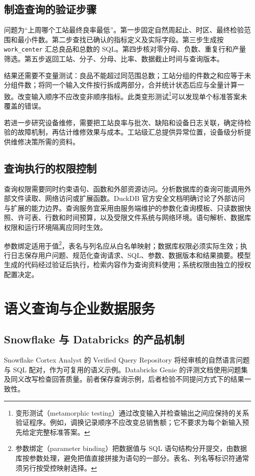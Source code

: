 \subsection{制造查询的验证步骤}
问题为“上周哪个工站最终良率最低”。第一步固定自然周起止、时区、最终检验范围和最小件数。第二步查找已确认的指标定义及实际字段。第三步生成按 \texttt{work\_center} 汇总良品和总数的 SQL。第四步核对零分母、负数、重复行和产量筛选。第五步返回工站、分子、分母、比率、数据截止时间与查询版本。

结果还需要不变量测试：良品不能超过同范围总数；工站分组的件数之和应等于未分组件数；将同一个输入文件按行拆成两部分，合并统计状态后应与全量计算一致。改变输入顺序不应改变非顺序指标。此类变形测试\footnote{变形测试（metamorphic testing）通过改变输入并检查输出之间应保持的关系验证程序。例如，调换记录顺序不应改变总销售额；它不要求为每个新输入预先给定完整标准答案。}可以发现单个标准答案未覆盖的错误。

若进一步研究设备维修，需要把工站良率与批次、缺陷和设备日志关联，确定待检验的故障机制，再估计维修效果与成本。工站级汇总提供异常位置，设备级分析提供维修决策所需的资料。

\subsection{查询执行的权限控制}
查询权限需要同时约束语句、函数和外部资源访问。分析数据库的查询可能调用外部文件读取、网络访问或扩展函数。DuckDB 官方安全文档明确讨论了外部访问与扩展的能力边界\cite{duckdb03}。查询服务宜采用由服务端维护的参数化查询模板、只读数据快照、许可表、行数和时间预算，以及受限文件系统与网络环境。语句解析、数据库权限和运行环境隔离应同时生效。

参数绑定适用于值\footnote{参数绑定（parameter binding）把数据值与 SQL 语句结构分开提交，由数据库按参数处理，避免把值直接拼接为语句的一部分。表名、列名等标识符通常须另行按受控映射选择。}，表名与列名应从白名单映射；数据库权限必须实际生效；执行日志保存用户问题、规范化查询请求、SQL、参数、数据版本和结果摘要。模型生成的代码经过验证后执行，检索内容作为查询资料使用；系统权限由独立的授权配置决定。

\section{语义查询与企业数据服务}

\subsection{Snowflake 与 Databricks 的产品机制}
Snowflake Cortex Analyst 的 Verified Query Repository 将经审核的自然语言问题与 SQL 配对，作为可复用的语义示例\cite{snowflake03}。Databricks Genie 的评测文档使用问题集及同义改写检查回答质量\cite{genie03}。前者保存查询示例，后者检验不同提问方式下的结果一致性。

